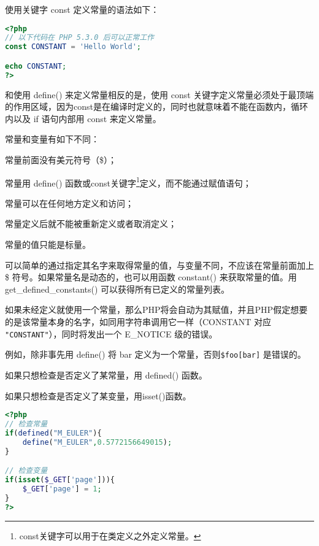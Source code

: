 使用关键字 const 定义常量的语法如下：

\begin{lstlisting}[language=PHP]
<?php
// 以下代码在 PHP 5.3.0 后可以正常工作
const CONSTANT = 'Hello World';

echo CONSTANT;
?>
\end{lstlisting}



和使用 define() 来定义常量相反的是，使用 const 关键字定义常量必须处于最顶端的作用区域，因为const是在编译时定义的，同时也就意味着不能在函数内，循环内以及 if 语句内部用 const 来定义常量。

常量和变量有如下不同：

\begin{compactitem}
\item 常量前面没有美元符号（\$）；
\item 常量用 define() 函数或const关键字\footnote{const关键字可以用于在类定义之外定义常量。}定义，而不能通过赋值语句；
\item 常量可以在任何地方定义和访问；
\item 常量定义后就不能被重新定义或者取消定义；
\item 常量的值只能是标量。
\end{compactitem}


可以简单的通过指定其名字来取得常量的值，与变量不同，不应该在常量前面加上 \$ 符号。如果常量名是动态的，也可以用函数 constant() 来获取常量的值。用 get\_defined\_constants() 可以获得所有已定义的常量列表。

如果未经定义就使用一个常量，那么PHP将会自动为其赋值，并且PHP假定想要的是该常量本身的名字，如同用字符串调用它一样（CONSTANT 对应 \texttt{"CONSTANT"}），同时将发出一个 E\_NOTICE 级的错误。

例如，除非事先用 define() 将 bar 定义为一个常量，否则\texttt{\$foo[bar]} 是错误的。

\begin{compactitem}
\item 如果只想检查是否定义了某常量，用 defined() 函数。
\item 如果只想检查是否定义了某变量，用isset()函数。
\end{compactitem}

\begin{lstlisting}[language=PHP]
<?php
// 检查常量
if(defined("M_EULER"){
	define("M_EULER",0.5772156649015);
}

// 检查变量
if(isset($_GET['page'])){
	$_GET['page'] = 1;
}
?>
\end{lstlisting}



